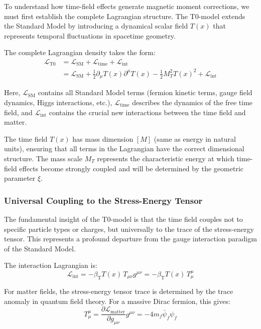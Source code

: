 \documentclass[12pt,a4paper]{article}
\newcommand{\Tfield}{T(x)}
\newcommand{\betaT}{\beta_{\text{T}}}
\newcommand{\xipar}{\xi}
\begin{document}
	To understand how time-field effects generate magnetic moment corrections, we must first establish the complete Lagrangian structure. The T0-model extends the Standard Model by introducing a dynamical scalar field $\Tfield$ that represents temporal fluctuations in spacetime geometry.
	
	The complete Lagrangian density takes the form:
	\begin{align}
		\mathcal{L}_{\text{T0}} &= \mathcal{L}_{\text{SM}} + \mathcal{L}_{\text{time}} + \mathcal{L}_{\text{int}} \\
		&= \mathcal{L}_{\text{SM}} + \frac{1}{2}\partial_\mu \Tfield \partial^\mu \Tfield - \frac{1}{2}M_T^2 \Tfield^2 + \mathcal{L}_{\text{int}}
	\end{align}
	
	Here, $\mathcal{L}_{\text{SM}}$ contains all Standard Model terms (fermion kinetic terms, gauge field dynamics, Higgs interactions, etc.), $\mathcal{L}_{\text{time}}$ describes the dynamics of the free time field, and $\mathcal{L}_{\text{int}}$ contains the crucial new interactions between the time field and matter.
	
	The time field $\Tfield$ has mass dimension $[M]$ (same as energy in natural units), ensuring that all terms in the Lagrangian have the correct dimensional structure. The mass scale $M_T$ represents the characteristic energy at which time-field effects become strongly coupled and will be determined by the geometric parameter $\xipar$.
	
	\subsubsection{Universal Coupling to the Stress-Energy Tensor}
	
	The fundamental insight of the T0-model is that the time field couples not to specific particle types or charges, but universally to the trace of the stress-energy tensor. This represents a profound departure from the gauge interaction paradigm of the Standard Model.
	
	The interaction Lagrangian is:
	\begin{equation}
		\mathcal{L}_{\text{int}} = -\betaT \Tfield \, T_{\mu\nu} g^{\mu\nu} = -\betaT \Tfield \, T^\mu_\mu
	\end{equation}
	
	For matter fields, the stress-energy tensor trace is determined by the trace anomaly in quantum field theory. For a massive Dirac fermion, this gives:
	\begin{equation}
		T^\mu_\mu = \frac{\partial \mathcal{L}_{\text{matter}}}{\partial g_{\mu\nu}} g^{\mu\nu} = -4m_f \bar{\psi}_f \psi_f
	\end{equation}
	
\end{document}
